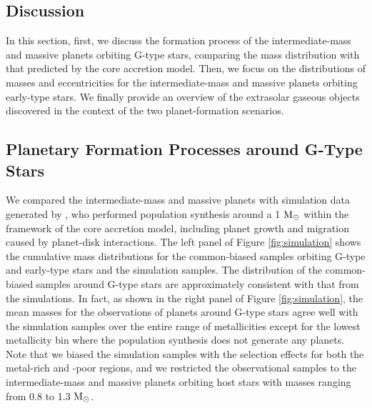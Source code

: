 \documentclass[twocolumn]{aastex62}
\begin{document}
\begin{CJK*}{UTF8}{min}
\section{Discussion} \label{sec:discussion}

In this section, first, we discuss the formation process of the intermediate-mass and massive planets orbiting G-type stars, comparing the mass distribution with that predicted by the core accretion model. Then, we focus on the distributions of masses and eccentricities for the intermediate-mass and massive planets orbiting early-type stars. We finally provide an overview of the extrasolar gaseous objects discovered in the context of the two planet-formation scenarios.


\subsection{Planetary Formation Processes around G-Type Stars} \label{subsec:G}

We compared the intermediate-mass and massive planets with simulation data generated by \cite{2012A&A...541A..97M}, who performed population synthesis around a 1 $\rm M_{\odot}$ within the framework of the core accretion model, including planet growth and migration caused by planet-disk interactions. The left panel of Figure \ref{fig:simulation} shows the cumulative mass distributions for the common-biased samples orbiting G-type and early-type stars and the simulation samples. The distribution of the common-biased samples around G-type stars are approximately consistent with that from the simulations. In fact, as shown in the right panel of Figure \ref{fig:simulation}, the mean masses for the observations of planets around G-type stars agree well with the simulation samples over the entire range of metallicities except for the lowest metallicity bin where the population synthesis does not generate any planets. Note that we biased the simulation samples with the selection effects for both the metal-rich and -poor regions, and we restricted the observational samples to the intermediate-mass and massive planets orbiting host stars with masses ranging from 0.8 to 1.3 $\rm M_{\odot}$.


\end{CJK*}
\end{document}
